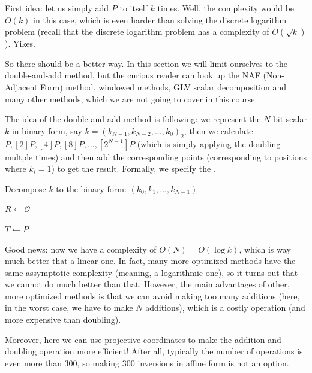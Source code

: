 \documentclass[../lecture-notes-148x210.tex]{subfiles}
\begin{document}
First idea: let us simply add $P$ to itself $k$ times. Well, the complexity would be $O(k)$ in this case, which is even harder than solving the discrete logarithm problem (recall that the discrete logarithm problem has a complexity of $O(\sqrt{k})$). Yikes.

So there should be a better way. In this section we will limit ourselves to the double-and-add method, but the curious reader can look up the NAF (Non-Adjacent Form) method, windowed methods, GLV scalar decomposition and many other methods, which we are not going to cover in this course.

The idea of the double-and-add method is following: we represent the $N$-bit scalar $k$ in binary form, say $k = (k_{N-1},k_{N-2},\dots,k_0)_2$, then we calculate $P, [2]P, [4]P, [8]P, \dots, [2^{N-1}]P$ (which is simply applying the doubling multple times) and then add the corresponding points (corresponding to positions where $k_i=1$) to get the result. Formally, we specify the .

\begin{algorithm}[H]
    \caption{Double-and-add method for scalar multiplication}\label{alg:double_and_add}
    
    Decompose $k$ to the binary form: $(k_0,k_1,\dots,k_{N-1})$
    
    $R \gets \mathcal{O}$
    
    $T \gets P$
    
    
\end{algorithm}    

Good news: now we have a complexity of $O(N)=O(\log k)$, which is way much better that a linear one. In fact, many more optimized methods have the same assymptotic complexity (meaning, a logarithmic one), so it turns out that 
we cannot do much better than that. However, the main advantages of other, more optimized methods is that we can avoid making too many additions (here, in the worst case, we have to make $N$ additions), which is a costly operation (and more expensive than doubling).

Moreover, here we can use projective coordinates to make the addition and doubling operation more efficient! After all, typically the number of operations is even more than $300$, so making $300$ inversions in affine form is not an option.
\end{document}
